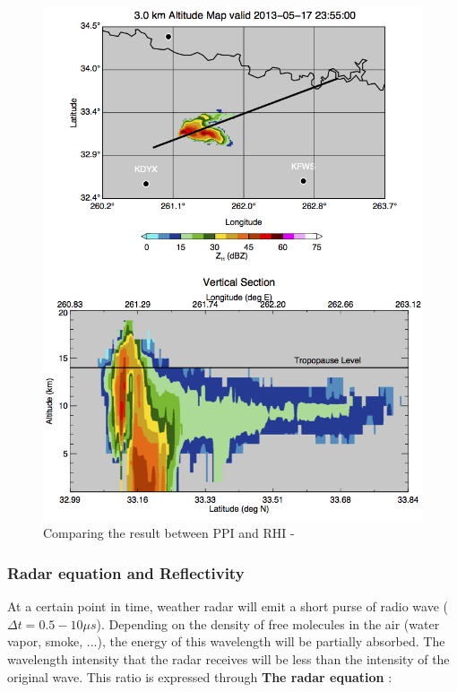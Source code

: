 \begin{figure}[H]
    \centering
    \includegraphics[width=\linewidth]{Images/2.1-ppi-and-rhi.png}
    \caption{Comparing the result between PPI and RHI - \cite{stackexchange-ppi-rhi}}
    \label{fig:ppi-and-rhi}
\end{figure}

\subsubsection{Radar equation and Reflectivity}
At a certain point in time, weather radar will emit a short purse of radio wave ($\Delta t = 0.5 - 10 \mu s$).
Depending on the density of free molecules in the air (water vapor, smoke, ...), the energy of this wavelength will be partially absorbed.
The wavelength intensity that the radar receives will be less than the intensity of the original wave.
This ratio is expressed through \textbf{The radar equation} \cite{2022Weather}:

